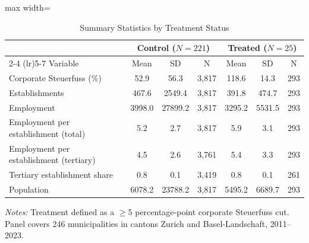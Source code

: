 \begin{table}[htbp]
\centering
\caption{Summary Statistics by Treatment Status}
\label{tab:summary}
\begin{adjustbox}{max width=\textwidth}
\begin{tabular}{lcccccc}
\toprule
& \multicolumn{3}{c}{Control ($N=221$)} & \multicolumn{3}{c}{Treated ($N=25$)} \\
\cmidrule(lr){2-4} \cmidrule(lr){5-7}
Variable & Mean & SD & N & Mean & SD & N \\
\midrule
Corporate Steuerfuss (\%) & 52.9 & 56.3 & 3,817 & 118.6 & 14.3 & 293 \\
Establishments & 467.6 & 2549.4 & 3,817 & 391.8 & 474.7 & 293 \\
Employment & 3998.0 & 27899.2 & 3,817 & 3295.2 & 5531.5 & 293 \\
Employment per establishment (total) & 5.2 & 2.7 & 3,817 & 5.9 & 3.1 & 293 \\
Employment per establishment (tertiary) & 4.5 & 2.6 & 3,761 & 5.4 & 3.3 & 293 \\
Tertiary establishment share & 0.8 & 0.1 & 3,419 & 0.8 & 0.1 & 261 \\
Population & 6078.2 & 23788.2 & 3,817 & 5495.2 & 6689.7 & 293 \\
\bottomrule
\end{tabular}
\end{adjustbox}
\begin{tablenotes}[flushleft]
\footnotesize
\item \textit{Notes:} Treatment defined as a $\geq$5 percentage-point corporate Steuerfuss cut. Panel covers 246 municipalities in cantons Zurich and Basel-Landschaft, 2011--2023.
\end{tablenotes}
\end{table}

